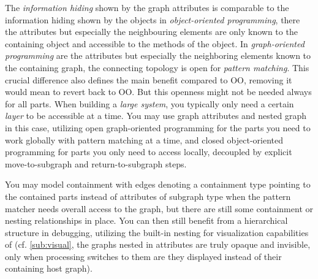 The \emph{information hiding} shown by the graph attributes is comparable to the information hiding shown by the objects in \emph{object-oriented programming}, there the attributes but especially the neighbouring elements are only known to the containing object and accessible to the methods of the object.
In \emph{graph-oriented programming} are the attributes but especially the neighboring elements known to the containing graph, the connecting topology is open for \emph{pattern matching}.
This crucial difference also defines the main benefit compared to OO, removing it would mean to revert back to OO.
But this openness might not be needed always for all parts.
When building a \emph{large system}, you typically only need a certain \emph{layer} to be accessible at a time.
You may use graph attributes and nested graph in this case,
utilizing open graph-oriented programming for the parts you need to work globally with pattern matching at a time,
and closed object-oriented programming for parts you only need to access locally,
decoupled by explicit move-to-subgraph and return-to-subgraph steps.

You may model containment with edges denoting a containment type pointing to the contained parts instead of attributes of subgraph type
when the pattern matcher needs overall access to the graph, but there are still some containment or nesting relationships in place.
You can then still benefit from a hierarchical structure in debugging, utilizing the built-in nesting for visualization capabilities of \GrG (cf. \ref{sub:visual}, the graphs nested in attributes are truly opaque and invisible, only when processing switches to them are they displayed instead of their containing host graph).


